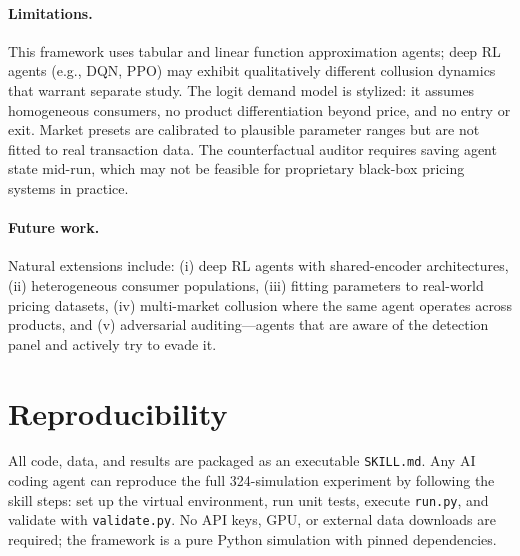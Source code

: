 \documentclass[11pt]{article}
\begin{document}
\paragraph{Limitations.}
This framework uses tabular and linear function approximation agents; deep RL agents (e.g., DQN, PPO) may exhibit qualitatively different collusion dynamics that warrant separate study.
The logit demand model is stylized: it assumes homogeneous consumers, no product differentiation beyond price, and no entry or exit.
Market presets are calibrated to plausible parameter ranges but are not fitted to real transaction data.
The counterfactual auditor requires saving agent state mid-run, which may not be feasible for proprietary black-box pricing systems in practice.

\paragraph{Future work.}
Natural extensions include: (i) deep RL agents with shared-encoder architectures, (ii) heterogeneous consumer populations, (iii) fitting parameters to real-world pricing datasets, (iv) multi-market collusion where the same agent operates across products, and (v) adversarial auditing---agents that are aware of the detection panel and actively try to evade it.

\section*{Reproducibility}

All code, data, and results are packaged as an executable \texttt{SKILL.md}.
Any AI coding agent can reproduce the full 324-simulation experiment by following the skill steps: set up the virtual environment, run unit tests, execute \texttt{run.py}, and validate with \texttt{validate.py}.
No API keys, GPU, or external data downloads are required; the framework is a pure Python simulation with pinned dependencies.
\end{document}
